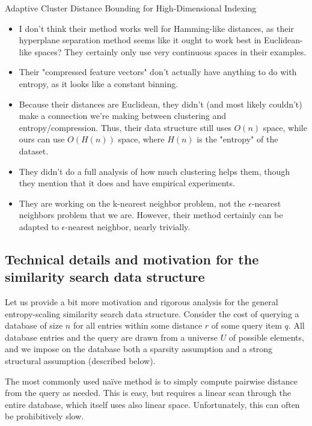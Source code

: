 \documentclass[review,preprint,12pt]{elsarticle}
\renewcommand{\cite}{\citep} %
\theoremstyle{definition}
\theoremstyle{remark}
\numberwithin{equation}{section}
\begin{document}
Adaptive Cluster Distance Bounding for High-Dimensional Indexing \cite{ramaswamy2011adaptive}
\begin{itemize}
\item I don't think their method works well for Hamming-like distances, as
   their hyperplane separation method seems like it ought to work best
   in Euclidean-like spaces? They certainly only use very continuous
   spaces in their examples.
\item Their "compressed feature vectors" don't actually have anything to do
   with entropy, as it looks like a constant binning.
\item Because their distances are Euclidean, they didn't (and most likely
   couldn't) make a connection we're making between clustering and
   entropy/compression. Thus, their data structure still uses $O(n)$
   space, while ours can use $O(H(n))$ space, where $H(n)$ is the "entropy"
   of the dataset.
\item They didn't do a full analysis of how much clustering helps them,
   though they mention that it does and have empirical experiments.
\item They are working on the k-nearest neighbor problem, not the
   $\epsilon$-nearest neighbors problem that we are. However, their method
   certainly can be adapted to $\epsilon$-nearest neighbor, nearly
   trivially.
\end{itemize}

\subsection{Technical details and motivation for the similarity search data structure}
Let us provide a bit more motivation and rigorous analysis for the general entropy-scaling similarity search data structure.
Consider the cost of querying a database of size $n$ for all entries within some distance $r$ of some query item $q$.
All database entries and the query are drawn from a universe $U$ of possible elements, and we impose on the database both a sparsity assumption and a strong structural assumption (described below).

The most commonly used na\"ive method is to simply compute pairwise distance from the query as needed.
This is easy, but requires a linear scan through the entire database, which itself uses also linear space.
Unfortunately, this can often be prohibitively slow.
\end{document}

